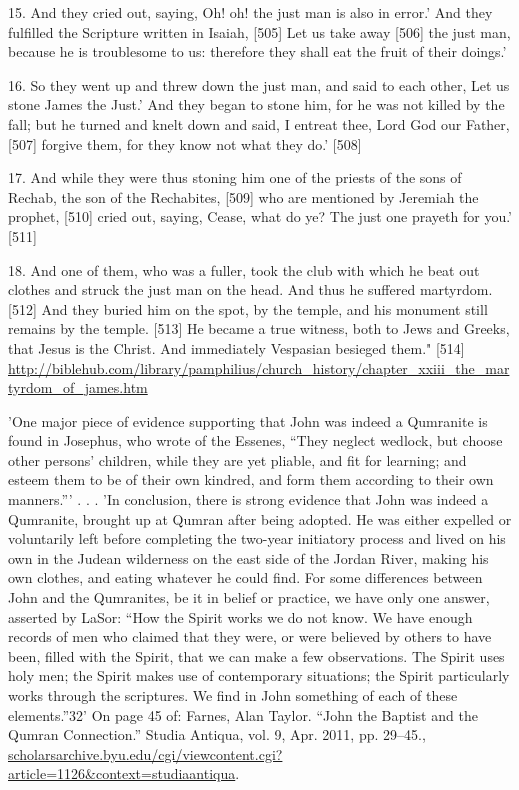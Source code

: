 \documentclass[11pt]{article}
\begin{document}
\begin{thebibliography}{37}
15. And they cried out, saying, Oh! oh! the just man is also in error.' And they fulfilled the Scripture written in Isaiah, [505] Let us take away [506] the just man, because he is troublesome to us: therefore they shall eat the fruit of their doings.'

16. So they went up and threw down the just man, and said to each other, Let us stone James the Just.' And they began to stone him, for he was not killed by the fall; but he turned and knelt down and said, I entreat thee, Lord God our Father, [507] forgive them, for they know not what they do.' [508]

17. And while they were thus stoning him one of the priests of the sons of Rechab, the son of the Rechabites, [509] who are mentioned by Jeremiah the prophet, [510] cried out, saying, Cease, what do ye? The just one prayeth for you.' [511]

18. And one of them, who was a fuller, took the club with which he beat out clothes and struck the just man on the head. And thus he suffered martyrdom. [512] And they buried him on the spot, by the temple, and his monument still remains by the temple. [513] He became a true witness, both to Jews and Greeks, that Jesus is the Christ. And immediately Vespasian besieged them." [514]
\url{http://biblehub.com/library/pamphilius/church_history/chapter_xxiii_the_martyrdom_of_james.htm}




'One major piece of evidence supporting that John was indeed a
Qumranite is found in Josephus, who wrote of the Essenes, “They neglect
wedlock, but choose other persons’ children, while they are yet pliable, and
fit for learning; and esteem them to be of their own kindred, and form them
according to their own manners.”'
. . .
'In conclusion, there is strong evidence that John was indeed a Qumranite,
brought up at Qumran after being adopted. He was either expelled or
voluntarily left before completing the two-year initiatory process and lived on
his own in the Judean wilderness on the east side of the Jordan River, making
his own clothes, and eating whatever he could find. For some differences
between John and the Qumranites, be it in belief or practice, we have only
one answer, asserted by LaSor: “How the Spirit works we do not know. We
have enough records of men who claimed that they were, or were believed by
others to have been, filled with the Spirit, that we can make a few observations.
The Spirit uses holy men; the Spirit makes use of contemporary situations; the
Spirit particularly works through the scriptures. We find in John something of
each of these elements.”32'
On page 45 of: Farnes, Alan Taylor. “John the Baptist and the Qumran Connection.” Studia Antiqua, vol. 9, Apr. 2011, pp. 29–45., \url{scholarsarchive.byu.edu/cgi/viewcontent.cgi?article=1126&context=studiaantiqua}.


\end{thebibliography}
\end{document}
